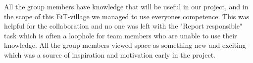 All the group members have knowledge that will be useful in our project, and in the scope of this EiT-village we managed to use everyones competence. This was helpful for the collaboration and no one was left with the "Report responsible" task which is often a loophole for team members who are unable to use their knowledge. All the group members viewed space as something new and exciting which was a source of inspiration and motivation early in the project.








